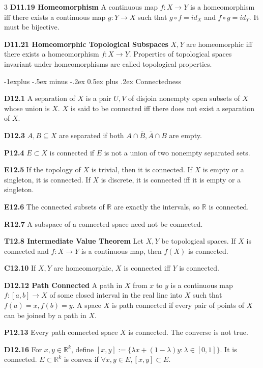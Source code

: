\documentclass[10pt, landscape]{article}
\makeatletter
\renewcommand{\section}{\@startsection{section}{1}{0mm}%
                                {-1ex plus -.5ex minus -.2ex}%
                                {0.5ex plus .2ex}%
                                {\normalfont\large\bfseries}}
\renewcommand{\section}{\@startsection{section}{2}{0mm}%
                                {-1explus -.5ex minus -.2ex}%
                                {0.5ex plus .2ex}%
                                {\normalfont\normalsize\bfseries}}
\makeatother
\begin{document}
\begin{multicols*}{3}
\textbf{D11.19 Homeomorphism} A continuous map $f: X \rightarrow Y$ is a homeomorphism iff there exists a continuous map $g: Y \rightarrow X$ such that $g \circ f=id_X$ and $f \circ g = id_Y$. It must be bijective.

\textbf{D11.21 Homeomorphic Topological Subspaces} $X, Y$ are homeomorphic iff there exists a homeomorphism $f: X \rightarrow Y$. Properties of topological spaces invariant under homeomorphisms are called topological properties.

\section{Connectedness}

\textbf{D12.1} A separation of $X$ is a pair $U,V$ of disjoin nonempty open subsets of $X$ whose union is $X$. $X$ is said to be connected iff there does not exist a separation of $X$.

\textbf{D12.3} $A,B \subseteq X$ are separated if both $A \cap \overline{B}, \overline{A} \cap B$ are empty.

\textbf{P12.4} $E \subset X$ is connected if $E$ is not a union of two nonempty separated sets.

\textbf{E12.5} If the topology of $X$ is trivial, then it is connected. If $X$ is empty or a singleton, it is connected. If $X$ is discrete, it is connected iff it is empty or a singleton.

\textbf{E12.6} The connected subsets of $\mathbb{R}$ are exactly the intervals, so $\mathbb{R}$ is connected.

\textbf{R12.7} A subspace of a connected space need not be connected.

\textbf{T12.8 Intermediate Value Theorem} Let $X, Y$ be topological spaces. If $X$ is connected and $f:X\rightarrow Y$ is a continuous map, then $f(X)$ is connected.

\textbf{C12.10} If $X, Y$ are homeomorphic, $X$ is connected iff $Y$ is connected.

\textbf{D12.12 Path Connected} A path in $X$ from $x$ to $y$ is a continuous map $f:[a,b]\rightarrow X$ of some closed interval in the real line into $X$ such that $f(a)=x, f(b)=y$. A space $X$ is path connected if every pair of points of $X$ can be joined by a path in $X$.

\textbf{P12.13} Every path connected space $X$ is connected. The converse is not true.

\textbf{D12.16} For $x,y \in \mathbb{R}^k$, define $[x,y]:=\{\lambda x+(1-\lambda)y: \lambda \in [0,1]\}$. It is connected. $E \subset \mathbb{R}^k$ is convex if $\forall x, y \in E, [x,y] \subset E$.


\end{multicols*}
\end{document}
